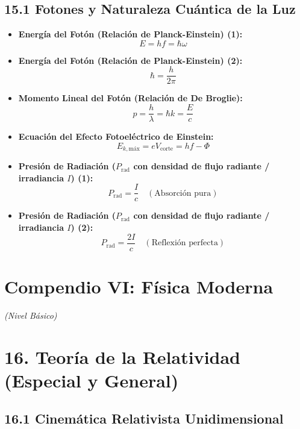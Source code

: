 \documentclass[11pt,a4paper]{article}
\begin{document}
\subsection*{15.1 Fotones y Naturaleza Cuántica de la Luz}

\begin{itemize}
  \item \textbf{Energía del Fotón (Relación de Planck-Einstein) (1):}
  \[
    E = h f = \hbar \omega
  \]
  \item \textbf{Energía del Fotón (Relación de Planck-Einstein) (2):}
  \[
    \hbar = \frac{h}{2\pi}
  \]
  \item \textbf{Momento Lineal del Fotón (Relación de De Broglie):}
  \[
    p = \frac{h}{\lambda} = \hbar k = \frac{E}{c}
  \]
  \item \textbf{Ecuación del Efecto Fotoeléctrico de Einstein:}
  \[
    E_{k,\mathrm{máx}} = e V_{\text{corte}} = h f - \Phi
  \]
  \item \textbf{Presión de Radiación ($P_{\mathrm{rad}}$ con densidad de flujo radiante / irradiancia $I$) (1):}
  \[
    P_{\mathrm{rad}} = \frac{I}{c} \quad (\text{Absorción pura})
  \]
  \item \textbf{Presión de Radiación ($P_{\mathrm{rad}}$ con densidad de flujo radiante / irradiancia $I$) (2):}
  \[
    P_{\mathrm{rad}} = \frac{2I}{c} \quad (\text{Reflexión perfecta})
  \]
\end{itemize}

\section*{Compendio VI: Física Moderna}

\textit{(Nivel Básico)}

\section*{16. Teoría de la Relatividad (Especial y General)}

\subsection*{16.1 Cinemática Relativista Unidimensional}
\end{document}
